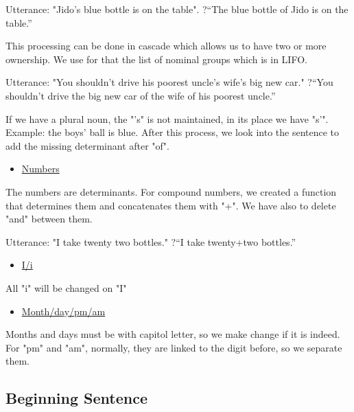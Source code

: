 \documentclass[twoside,a4paper,10pt]{report}
\begin{document}
\small
\begin{verbatimtab}
  Utterance: "Jido's blue bottle is on the table". 
  ?“The blue bottle of Jido is on the table.” 
\end{verbatimtab}
\normalsize
This processing can be done in cascade which allows us to have two or more ownership. We use for that the list of nominal groups which is in LIFO.


\small
\begin{verbatimtab}
  Utterance: "You shouldn't drive his poorest uncle's wife's big new car." 
  ?“You shouldn’t drive the big new car of the wife of his poorest uncle.”
\end{verbatimtab}
\normalsize
If we have a plural noun, the "’s" is not maintained, in its place we have "s’".
Example: the boys' ball is blue.
After this process, we look into the sentence to add the missing determinant after "of".



\begin{itemize}
    \item  \underline{Numbers}
\end{itemize}
The numbers are determinants. For compound numbers, we created a function that determines them and concatenates them with "+". We have also to delete "and" between them.


\small
\begin{verbatimtab}
  Utterance: "I take twenty two bottles."
  ?“I take twenty+two bottles.”
\end{verbatimtab}
\normalsize

\begin{itemize}
    \item  \underline{I/i}
\end{itemize}
All "i" will be changed on "I"



\begin{itemize}
    \item  \underline{Month/day/pm/am}
\end{itemize}
Months and days must be with capitol letter, so we make change if it is indeed. For "pm" and "am", normally, they are linked to the digit before, so we separate them.


\subsection{Beginning Sentence}
\label{194989f378cb64e64758160f2e624d3f}%
\end{document}
